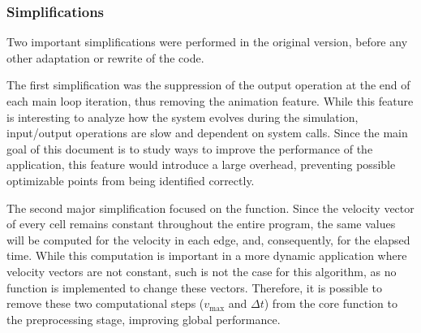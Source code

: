 \subsubsection{Simplifications}
\label{sec:311}


Two important simplifications were performed in the original version, before any other adaptation or rewrite of the code.

The first simplification was the suppression of the output operation at the end of each main loop iteration, thus removing the animation feature. While this feature is interesting to analyze how the system evolves during the simulation, input/output operations are slow and dependent on system calls.
Since the main goal of this document is to study ways to improve the performance of the \polu application, this feature would introduce a large overhead, preventing possible optimizable points from being identified correctly.

The second major simplification focused on the \computeflux function.
Since the velocity vector of every cell remains constant throughout the entire program, the same values will be computed for the velocity in each edge, and, consequently, for the elapsed time.
While this computation is important in a more dynamic application where velocity vectors are not constant, such is not the case for this algorithm, as no function is implemented to change these vectors.
Therefore, it is possible to remove these two computational steps ($v_{\mathrm{max}}$ and $\Delta t$) from the core function to the preprocessing stage, improving global performance.
